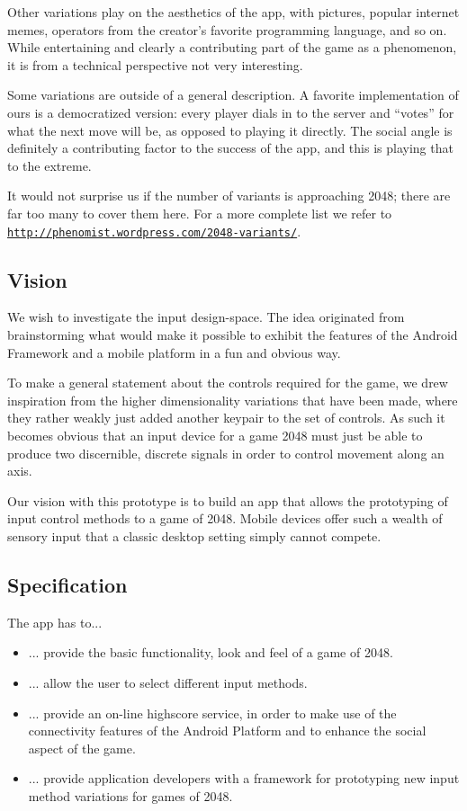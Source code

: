 \documentclass[a4paper, 12pt]{article}
\newcommand{\link}[1]{\href{http://#1}{\texttt{#1}}}
\begin{document}
Other variations play on the aesthetics of the app, with pictures,
popular internet memes, operators from the creator's favorite
programming language, and so on. While entertaining and clearly a
contributing part of the game as a phenomenon, it is from a technical
perspective not very interesting.

Some variations are outside of a general description. A favorite
implementation of ours is a democratized version: every player dials
in to the server and ``votes'' for what the next move will be, as
opposed to playing it directly. The social angle is definitely a
contributing factor to the success of the app, and this is playing
that to the extreme.

It would not surprise us if the number of variants is approaching
2048; there are far too many to cover them here. For a more complete
list we refer to \link{http://phenomist.wordpress.com/2048-variants/}.

\subsection{Vision}

We wish to investigate the input design-space. The idea originated
from brainstorming what would make it possible to exhibit the features
of the Android Framework and a mobile platform in a fun and obvious
way.

To make a general statement about the controls required for the game,
we drew inspiration from the higher dimensionality variations that
have been made, where they rather weakly just added another keypair to
the set of controls. As such it becomes obvious that an input device
for a game 2048 must just be able to produce two discernible, discrete
signals in order to control movement along an axis. 

Our vision with this prototype is to build an app that allows the
prototyping of input control methods to a game of 2048. Mobile devices
offer such a wealth of sensory input that a classic desktop setting
simply cannot compete. 

\subsection{Specification}

The app has to...
\begin{itemize}
\item ... provide the basic functionality, look and feel of a game of 2048.
\item ... allow the user to select different input methods.
\item ... provide an on-line highscore service, in order to make use
  of the connectivity features of the Android Platform and to enhance
  the social aspect of the game.
\item ... provide application developers with a framework for
  prototyping new input method variations for games of 2048.
\end{itemize}
\end{document}

